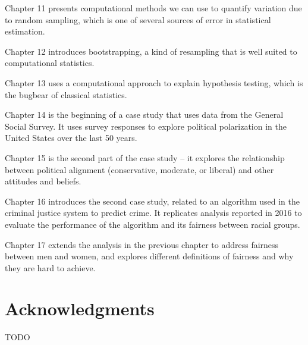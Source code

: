 \begin{description}
\item Chapter 11 presents computational methods we can use to quantify variation due to random sampling, which is one of several sources of error in statistical estimation.

\item Chapter 12 introduces bootstrapping, a kind of resampling that is
well suited to computational statistics.

\item Chapter 13 uses a computational approach to explain hypothesis testing, which is the bugbear of classical statistics.

\item Chapter 14 is the beginning of a case study that uses data from the General Social Survey. It uses survey responses to explore political polarization in the United States over the last 50 years.

\item Chapter 15 is the second part of the case study -- it explores the relationship between political alignment (conservative, moderate, or liberal) and other attitudes and beliefs.

\item Chapter 16 introduces the second case study, related to an algorithm used in the criminal justice system to predict crime. It replicates analysis reported in 2016 to evaluate the performance of the algorithm and its fairness between racial groups.

\item Chapter 17 extends the analysis in the previous chapter to address fairness between men and women, and explores different definitions of fairness and why they are hard to achieve.

\section*{Acknowledgments}

TODO

\end{description}
